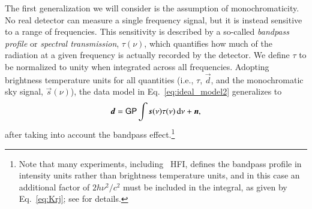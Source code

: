 \documentclass[onecolumn]{aa}
\renewcommand{\d}[0]{\vec{d}}
\newcommand{\n}[0]{\vec{n}}
\newcommand{\s}[0]{\vec{s}}
\renewcommand{\P}[0]{\tens{P}}
\renewcommand{\G}[0]{\tens{G}}
\begin{document}
The first generalization we will consider is the assumption of
monochromaticity. No real detector can measure a single frequency
signal, but it is instead sensitive to a range of frequencies. This
sensitivity is described by a so-called \emph{bandpass profile} or
\emph{spectral transmission}, $\tau(\nu)$, which quantifies how much
of the radiation at a given frequency is actually recorded by the
detector. We define $\tau$ to be normalized to unity when integrated across
all frequencies. Adopting brightness temperature units for all
quantities (i.e., $\tau$, $\d$, and the monochromatic sky signal,
$\s(\nu)$), the data model in Eq.~\eqref{eq:ideal_model2} generalizes to
\begin{equation}
  \d = \G \P\int \s(\nu)\tau(\nu)\,\mathrm d\nu + \n,
  \label{eq:bp}
\end{equation}
after taking into account the bandpass effect.\footnote{Note that many
  experiments, including \Planck\ HFI, defines the bandpass profile in
  intensity units rather than brightness temperature units, and in
  this case an additional factor of $2h\nu^2/c^2$ must be included in
  the integral, as given by Eq.~\eqref{eq:Krj}; see
  \citet{planck2013-p03d} for details.}
\end{document}
